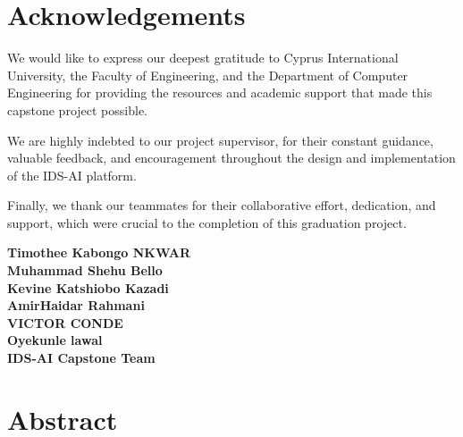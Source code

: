 \documentclass[12pt,a4paper]{report}
\begin{document}
\setcounter{page}{2}

\chapter*{Acknowledgements}

We would like to express our deepest gratitude to Cyprus International University, the Faculty of Engineering, and the Department of Computer Engineering for providing the resources and academic support that made this capstone project possible.

We are highly indebted to our project supervisor, for their constant guidance, valuable feedback, and encouragement throughout the design and implementation of the IDS-AI platform.

Finally, we thank our teammates for their collaborative effort, dedication, and support, which were crucial to the completion of this graduation project.

\vspace{1cm}
\begin{flushright}
\textbf{Timothee Kabongo NKWAR} \\
\textbf{Muhammad Shehu Bello} \\
\textbf{Kevine Katshiobo Kazadi} \\
\textbf{AmirHaidar Rahmani} \\
\textbf{VICTOR CONDE} \\
\textbf{Oyekunle lawal} \\
\vspace{0.3cm}
\textbf{IDS-AI Capstone Team}
\end{flushright}

\clearpage

\chapter*{Abstract}
\end{document}
